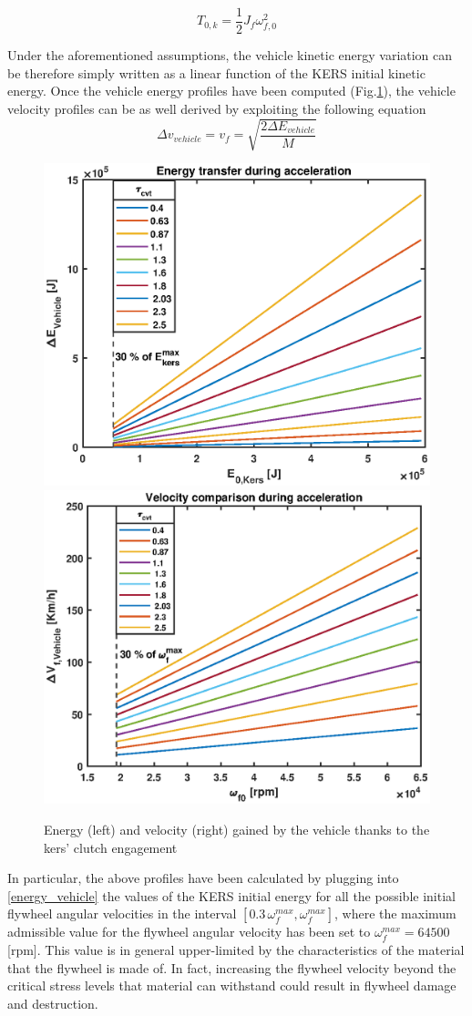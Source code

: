 \documentclass[11pt]{article}
\begin{document}
\begin{equation}
T_{0,k} = \frac{1}{2}J_f\omega_{f,0}^2
\end{equation}

Under the aforementioned assumptions, the vehicle kinetic energy variation can be therefore simply written as a linear function of the KERS initial kinetic energy. Once the vehicle energy profiles have been computed (Fig.\ref{en_comp_acc}), the vehicle velocity profiles can be as well derived by exploiting the following equation
\begin{equation}
\Delta v_{vehicle} = v_f = \sqrt{\frac{2\Delta E_{vehicle}}{M}}
\end{equation}

\begin{figure}[H]
\captionsetup{font=small, justification=centering}
\centering
\includegraphics[width=.49\textwidth]{Images/Results_new/Univariate_SteadyState/en_comp_acc.eps}\hfill
\includegraphics[width=.49\textwidth]{Images/Results_new/Univariate_SteadyState/vel_comp_acc.eps}
\caption{Energy (left) and velocity (right) gained by the vehicle thanks to the kers' clutch engagement}
\label{en_comp_acc}
\end{figure}

In particular, the above profiles have been calculated by plugging into \eqref{energy_vehicle} the values of the KERS initial energy for all the possible initial flywheel angular velocities in the interval $[0.3 \, \omega_f^{max}, \omega_f^{max}]$, where the maximum admissible value for the flywheel angular velocity has been set to $\omega_f^{max}=64500$ [rpm]. This value is in general upper-limited by the characteristics of the material that the flywheel is made of. In fact, increasing the flywheel velocity beyond the critical stress levels that material can withstand could result in flywheel damage and destruction.
\end{document}
